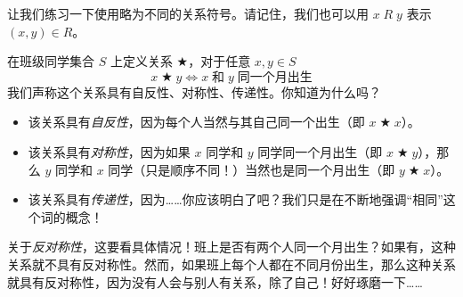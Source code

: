 \begin{example}
    让我们练习一下使用略为不同的关系符号。请记住，我们也可以用 $x \;R\; y$ 表示 $(x, y) \in R$。

    在班级同学集合 $S$ 上定义关系 $\bigstar$，对于任意 $x,y \in S$
    \[x \;\bigstar\; y \iff x \;\text{和}\; y \;\text{同一个月出生}\]
    我们声称这个关系具有自反性、对称性、传递性。你知道为什么吗？
    \begin{itemize}
        \item 该关系具有\emph{自反性}，因为每个人当然与其自己同一个出生（即 $x \;\bigstar\; x$）。
        \item 该关系具有\emph{对称性}，因为如果 $x$ 同学和 $y$ 同学同一个月出生（即 $x \;\bigstar\; y$），那么 $y$ 同学和 $x$ 同学（只是顺序不同！）当然也是同一个月出生（即 $y \;\bigstar\; x$）。
        \item 该关系具有\emph{传递性}，因为……你应该明白了吧？我们只是在不断地强调``相同''这个词的概念！
    \end{itemize}
    关于\emph{反对称性}，这要看具体情况！班上是否有两个人同一个月出生？如果有，这种关系就不具有反对称性。然而，如果班上每个人都在不同月份出生，那么这种关系就具有反对称性，因为没有人会与别人有关系，除了自己！好好琢磨一下……
\end{example}
